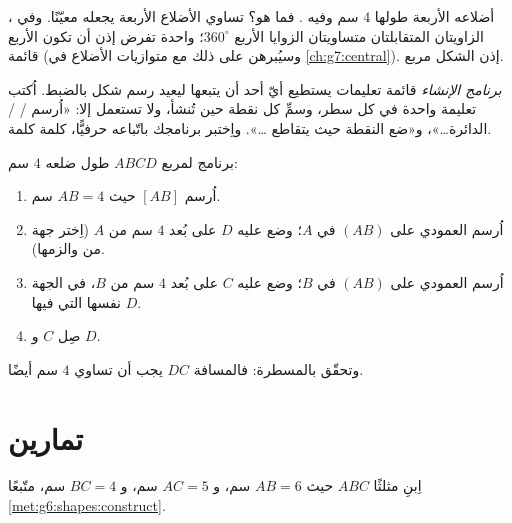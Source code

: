 \begin{example}\label{ex:g6:shapes:recognize}
 أضلاعه الأربعة طولها $4$ سم وفيه .
فما هو؟ تساوي الأضلاع الأربعة يجعله معيّنًا. وفي ، الزاويتان
المتقابلتان متساويتان  الزوايا الأربع $360^\circ$؛ 
واحدة تفرض إذن أن تكون الأربع قائمة (وسيُبرهن على ذلك مع
متوازيات الأضلاع في \cref{ch:g7:central}). إذن الشكل مربع.
\end{example}

\begin{method}\label{met:g6:shapes:program}
\emph{برنامج الإنشاء} قائمة تعليمات يستطيع أيّ أحد أن
يتبعها ليعيد رسم شكل بالضبط. اُكتب تعليمة واحدة في كل سطر،
وسمِّ كل نقطة حين تُنشأ، ولا تستعمل إلا: «اُرسم 
/  / الدائرة\dots»، و«ضع النقطة حيث يتقاطع \dots». واِختبر
برنامجك باتّباعه حرفيًّا، كلمة كلمة.
\end{method}

\begin{example}\label{ex:g6:shapes:program}
برنامج لمربع $ABCD$ طول ضلعه $4$ سم:
\begin{enumerate}
  \item اُرسم  $[AB]$ حيث $AB = 4$ سم.
  \item اُرسم العمودي على $(AB)$ في $A$؛ وضع عليه $D$ على بُعد
        $4$ سم من $A$ (اِختر جهة من  والزمها).
  \item اُرسم العمودي على $(AB)$ في $B$؛ وضع عليه $C$ على بُعد
        $4$ سم من $B$، في الجهة نفسها التي فيها $D$.
  \item صِل $C$ و $D$.
\end{enumerate}
وتحقّق بالمسطرة: فالمسافة $DC$ يجب أن تساوي $4$ سم أيضًا.
\end{example}

\section{تمارين}

\begin{exercise}[$\star$]\label{exo:g6:shapes:1}
اِبنِ مثلثًا $ABC$ حيث $AB = 6$ سم، و $AC = 5$ سم، و
$BC = 4$ سم، متّبعًا \cref{met:g6:shapes:construct}.
\end{exercise}

